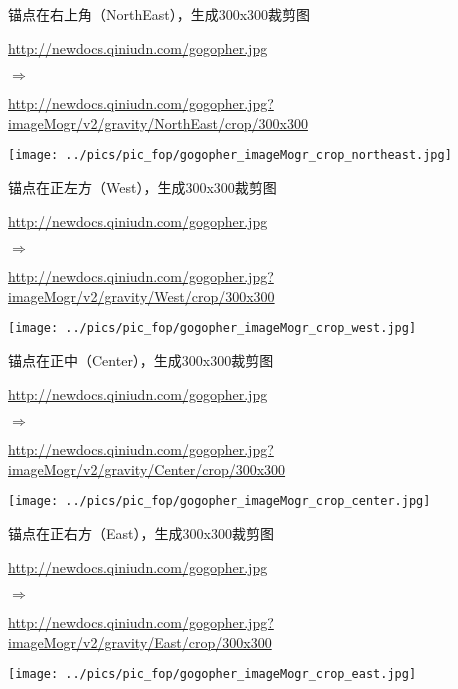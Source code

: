 \documentclass[11pt, oneside]{book}
\newcommand{\qsym}[1]{
\footnotesize
\noindent
#1\par
\normalsize
}
\newcommand{\qsamplelink}[1]{
\vspace{0.2em}
\noindent
#1\par
\vspace{0.1em}
}
\newcommand{\qurl}[1]{\footnotesize\url{#1}\normalsize}
\begin{document}
\begin{sample}
  \caption{锚点在右上角（NorthEast），生成300x300裁剪图}
    \qsamplelink{\qurl{http://newdocs.qiniudn.com/gogopher.jpg}}
    \qsym{$\Rightarrow$}
    \qsamplelink{\qurl{http://newdocs.qiniudn.com/gogopher.jpg?imageMogr/v2/gravity/NorthEast/crop/300x300}}

    \begin{center}
      \texttt{[image: ../pics/pic\_fop/gogopher\_imageMogr\_crop\_northeast.jpg]}
    \end{center}
  \label{imageMogr-crop-northeast}
\end{sample}

\begin{sample}
  \caption{锚点在正左方（West），生成300x300裁剪图}
    \qsamplelink{\qurl{http://newdocs.qiniudn.com/gogopher.jpg}}
    \qsym{$\Rightarrow$}
    \qsamplelink{\qurl{http://newdocs.qiniudn.com/gogopher.jpg?imageMogr/v2/gravity/West/crop/300x300}}

    \begin{center}
      \texttt{[image: ../pics/pic\_fop/gogopher\_imageMogr\_crop\_west.jpg]}
    \end{center}
  \label{imageMogr-crop-west}
\end{sample}

\begin{sample}
  \caption{锚点在正中（Center），生成300x300裁剪图}
    \qsamplelink{\qurl{http://newdocs.qiniudn.com/gogopher.jpg}}
    \qsym{$\Rightarrow$}
    \qsamplelink{\qurl{http://newdocs.qiniudn.com/gogopher.jpg?imageMogr/v2/gravity/Center/crop/300x300}}

    \begin{center}
      \texttt{[image: ../pics/pic\_fop/gogopher\_imageMogr\_crop\_center.jpg]}
    \end{center}
  \label{imageMogr-crop-center}
\end{sample}

\begin{sample}
  \caption{锚点在正右方（East），生成300x300裁剪图}
    \qsamplelink{\qurl{http://newdocs.qiniudn.com/gogopher.jpg}}
    \qsym{$\Rightarrow$}
    \qsamplelink{\qurl{http://newdocs.qiniudn.com/gogopher.jpg?imageMogr/v2/gravity/East/crop/300x300}}

    \begin{center}
      \texttt{[image: ../pics/pic\_fop/gogopher\_imageMogr\_crop\_east.jpg]}
    \end{center}
  \label{imageMogr-crop-east}
\end{sample}
\end{document}

